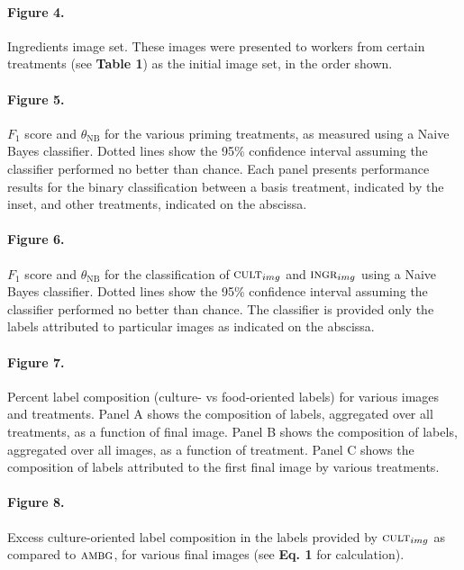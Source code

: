\documentclass[a4paper]{report}
\begin{document}
\paragraph{Figure 4.}
	Ingredients image set. These images were presented to workers from 
	certain treatments (see \textbf{Table 1}) as the initial image set, in the 
	order shown.  

\paragraph{Figure 5.}
$F_1$ score and $\theta_\text{NB}$ for the various 
priming treatments, as measured using a Naive Bayes classifier. Dotted lines 
show the 95\% confidence interval
assuming the classifier performed no better than chance.  Each panel 
presents performance results for the binary classification between a basis 
treatment, indicated by the inset, and other treatments, indicated on the 
abscissa.

\paragraph{Figure 6.}
$F_1$ score and $\theta_\text{NB}$ for the classification of 
$\textsc{cult}_{img}$ and $\textsc{ingr}_{img}$ using a Naive Bayes 
classifier.  Dotted lines 
show the 95\% confidence interval
assuming the classifier performed no better than chance.  The classifier is provided only the labels attributed to
particular images as indicated on the abscissa.

\paragraph{Figure 7.}
Percent label composition (culture- vs food-oriented labels) for 
various images and treatments.  Panel A shows the 
composition of labels, aggregated over all treatments, as a function of 
final image.
Panel B shows the composition of labels, aggregated over all images, as
a function of treatment.  Panel C shows the composition of labels 
attributed to the first final image by various treatments.

\paragraph{Figure 8.}
Excess culture-oriented label composition in the labels provided
by $\textsc{cult}_{img}$ as compared to $\textsc{ambg}$, for various
final images (see \textbf{Eq. 1} for calculation).
\end{document}
